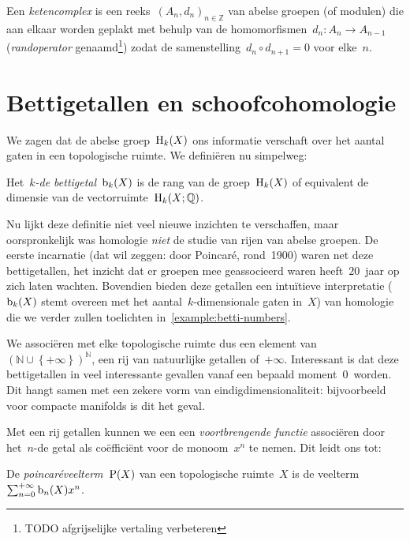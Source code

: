 \documentclass[a4paper,11pt,openany,oneside,article]{memoir}
\begin{document}
\begin{definition}
  Een \emph{ketencomplex} is een reeks~$(A_n,d_n)_{n\in\mathbb{Z}}$ van abelse groepen (of modulen) die aan elkaar worden geplakt met behulp van de homomorfismen~$d_n\colon A_n\to A_{n-1}$ (\emph{randoperator} genaamd\footnote{TODO afgrijselijke vertaling verbeteren}) zodat de samenstelling~$d_n\circ d_{n+1}=0$ voor elke~$n$.
\end{definition}



\section{Bettigetallen en schoofcohomologie}\label{section:betti-numbers}
We zagen dat de abelse groep~$\mathrm{H}_k(X)$ ons informatie verschaft over het aantal gaten in een topologische ruimte. We defini\"eren nu simpelweg:
\begin{definition}
  Het~\emph{$k$\nobreakdash-de bettigetal~$\mathrm{b}_k(X)$} is de rang van de groep~$\mathrm{H}_k(X)$ of equivalent de dimensie van de vectorruimte~$\mathrm{H}_k(X;\mathbb{Q})$.
\end{definition}

Nu lijkt deze definitie niet veel nieuwe inzichten te verschaffen, maar oorspronkelijk was homologie \emph{niet} de studie van rijen van abelse groepen. De eerste incarnatie (dat wil zeggen: door Poincar\'e, rond~1900) waren net deze bettigetallen, het inzicht dat er groepen mee geassocieerd waren heeft~$20$~jaar op zich laten wachten. Bovendien bieden deze getallen een intu\"itieve interpretatie ($\mathrm{b}_k(X)$ stemt overeen met het aantal~$k$\nobreakdash-dimensionale gaten in~$X$) van homologie die we verder zullen toelichten in~\cref{example:betti-numbers}.

We associ\"eren met elke topologische ruimte dus een element van~$(\mathbb{N}\cup\left\{ +\infty \right\})^\mathbb{N}$, een rij van natuurlijke getallen of~$+\infty$. Interessant is dat deze bettigetallen in veel interessante gevallen vanaf een bepaald moment~$0$~worden. Dit hangt samen met een zekere vorm van eindigdimensionaliteit: bijvoorbeeld voor compacte manifolds is dit het geval.

Met een rij getallen kunnen we een een \emph{voortbrengende functie} associ\"eren door het~$n$\nobreakdash-de getal als co\"effici\"ent voor de monoom~$x^n$ te nemen. Dit leidt ons tot:

\begin{definition}
  De \emph{poincar\'eveelterm}~$\mathrm{P}(X)$ van een topologische ruimte~$X$ is de veelterm~$\sum_{n=0}^{+\infty}\mathrm{b}_n(X) x^n$.
\end{definition}
\end{document}
